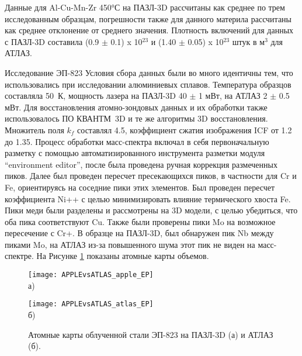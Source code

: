 Данные для Al-Cu-Mn-Zr 450°С на ПАЗЛ-3D рассчитаны как среднее по трем исследованным образцам, погрешности также для данного материла рассчитаны как среднее отклонение от среднего значения. Плотность включений для данных с ПАЗЛ-3D составила (0.9 $\pm$ 0.1) x 10$^{23}$ и (1.40 $\pm$ 0.05) x 10$^{23}$ штук в м$^3$ для АТЛАЗ.

Исследование ЭП-823
Условия сбора данных были во много идентичны тем, что использовались при исследовании алюминиевых сплавов. Температура образцов составляла 50~К, мощность лазера на ПАЗЛ-3D 40 $\pm$ 1 мВт, на АТЛАЗ 2 $\pm$ 0.5 мВт. Для восстановления атомно-зондовых данных и их обработки также использовалось ПО КВАНТМ~3D и те же алгоритмы 3D восстановления. Множитель поля $k_f$ составлял 4.5, коэффициент сжатия изображения ICF от 1.2 до 1.35. Процесс обработки масс-спектра включал в себя первоначальную разметку с помощью автоматизированного инструмента разметки модуля “environment editor”, после была проведена ручная коррекция размеченных пиков. Далее был проведен пересчет пресекающихся пиков, в частности для Cr и Fe, ориентируясь на соседние пики этих элементов. Был проведен пересчет коэффициента Ni++ с целью минимизировать влияние термического хвоста Fe. Пики меди были разделены и рассмотрены на 3D модели, с целью убедиться, что оба пика соответствуют Cu. Также были проверены пики Mo на возможное пересечение с Cr+. В образце на ПАЗЛ-3D, был обнаружен пик Nb между пиками Mo, на АТЛАЗ из-за повышенного шума этот пик не виден на масс-спектре. На Рисунке \cref{fig:APPLEvsATLAS_EP} показаны атомные карты объемов.

\begin{figure}[h!tb]
	\begin{minipage}[b][][b]{0.49\textwidth}\centering
		\texttt{[image: APPLEvsATLAS\_apple\_EP]} \\ а)
	\end{minipage}
	\begin{minipage}[b][][b]{0.49\textwidth}\centering
		\texttt{[image: APPLEvsATLAS\_atlas\_EP]} \\ б)
	\end{minipage}
	\caption{Атомные карты облученной стали ЭП-823 на ПАЗЛ-3D (а) и АТЛАЗ (б).}
	\label{fig:APPLEvsATLAS_EP}
\end{figure} 

